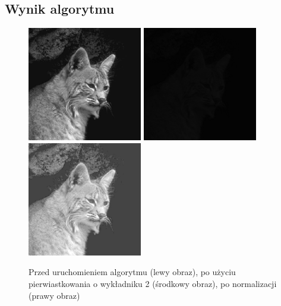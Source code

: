 \documentclass[a4paper,12pt]{book}
\begin{document}
\subsection*{Wynik algorytmu}
\begin{figure}[H]
	\caption{Przed uruchomieniem algorytmu (lewy obraz), po użyciu pierwiastkowania o wykładniku 2 (środkowy obraz), po normalizacji (prawy obraz)}
	\includegraphics[width=5cm, height=5cm]{cat-unmodified.jpg}
	\includegraphics[width=5cm, height=5cm]{2-6/root-gray-cat-2.png}
	\includegraphics[width=5cm, height=5cm]{2-6/root-gray-cat-2-norm.png}
\end{figure}
\end{document}
